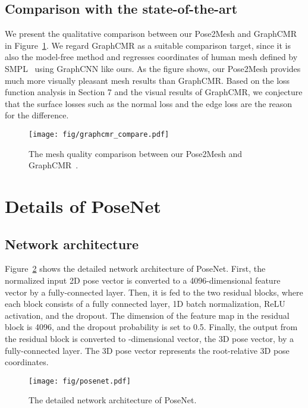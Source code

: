 \documentclass[runningheads]{llncs}
\begin{document}
\subsection{Comparison with the state-of-the-art}
We present the qualitative comparison between our Pose2Mesh and GraphCMR~\cite{kolotouros2019cmr} in Figure~\ref{fig:compare}.
We regard GraphCMR as a suitable comparison target, since it is also the model-free method and regresses coordinates of human mesh defined by SMPL~\cite{loper2015smpl} using GraphCNN like ours.
As the figure shows, our Pose2Mesh provides much more visually pleasant mesh results than GraphCMR.
Based on the loss function analysis in Section 7 and the visual results of GraphCMR, we conjecture that the surface losses such as the normal loss and the edge loss are the reason for the difference. 

\begin{figure}\begin{center}
\texttt{[image: fig/graphcmr\_compare.pdf]}
\end{center}
\vspace*{-3mm}
   \caption{
    The mesh quality comparison between our Pose2Mesh and GraphCMR~\cite{kolotouros2019cmr}.
   }
\label{fig:compare}
\end{figure}

\section{Details of PoseNet}
\subsection{Network architecture}
Figure~\ref{fig:posenet} shows the detailed network architecture of PoseNet.
First, the normalized input 2D pose vector is converted to a 4096-dimensional feature vector by a fully-connected layer.
Then, it is fed to the two residual blocks, where each block consists of a fully connected layer, 1D batch normalization, ReLU activation, and the dropout.
The dimension of the feature map in the residual block is 4096, and the dropout probability is set to 0.5.
Finally, the output from the residual block is converted to -dimensional vector, the 3D pose vector, by a fully-connected layer.
The 3D pose vector represents the root-relative 3D pose coordinates.

\begin{figure}[!hbt]
\centerline{
\texttt{[image: fig/posenet.pdf]}}
\caption
{
The detailed network architecture of PoseNet.
}
\label{fig:posenet}
\end{figure}
\end{document}
